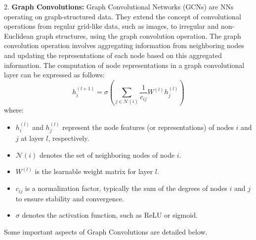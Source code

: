 2. \textbf{Graph Convolutions:}
Graph Convolutional Networks (GCNs) are NNs operating on graph-structured data. They extend the concept of convolutional operations from regular grid-like data, such as images, to irregular and non-Euclidean graph structures, using the graph convolution operation. The graph convolution operation involves aggregating information from neighboring nodes and updating the representations of each node based on this aggregated information. The computation of node representations in a graph convolutional layer can be expressed as follows:
\begin{equation}
h_i^{(l+1)} = \sigma\left( \sum_{j \in \mathcal{N}(i)} \frac{1}{c_{ij}} W^{(l)} h_j^{(l)} \right)
\end{equation}
where:
\begin{itemize}
\item $h_i^{(l)}$ and $h_j^{(l)}$ represent the node features (or representations) of nodes $i$ and $j$ at layer $l$, respectively.
\item $\mathcal{N}(i)$ denotes the set of neighboring nodes of node $i$.
\item $W^{(l)}$ is the learnable weight matrix for layer $l$.
\item $c_{ij}$ is a normalization factor, typically the sum of the degrees of nodes $i$ and $j$ to ensure stability and convergence.
\item $\sigma$ denotes the activation function, such as ReLU or sigmoid.
\end{itemize}
Some important aspects of Graph Convolutions are detailed below. 
